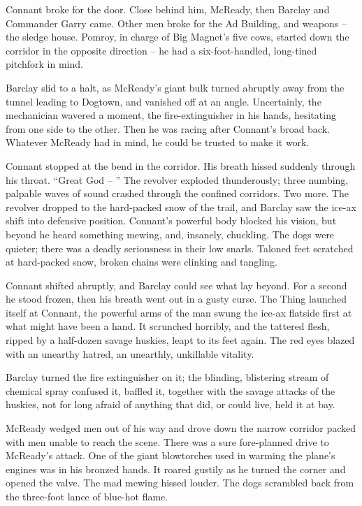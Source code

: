 \documentclass[letterpaper,openany,12pt]{memoir}		%
\begin{document}
Connant broke for the door. Close behind him, McReady, then Barclay and
Commander Garry came. Other men broke for the Ad Building, and weapons -- the
sledge house. Pomroy, in charge of Big Magnet's five cows, started down the
corridor in the opposite direction -- he had a six-foot-handled, long-tined
pitchfork in mind.

Barclay slid to a halt, as McReady's giant bulk turned abruptly away from the
tunnel leading to Dogtown, and vanished off at an angle. Uncertainly, the
mechanician wavered a moment, the fire-extinguisher in his hands, hesitating
from one side to the other. Then he was racing after Connant's broad back.
Whatever McReady had in mind, he could be trusted to make it work.

Connant stopped at the bend in the corridor. His breath hissed suddenly through
his throat. ``Great God -- '' The revolver exploded thunderously; three numbing,
palpable waves of sound crashed through the confined corridors. Two more. The
revolver dropped to the hard-packed snow of the trail, and Barclay saw the
ice-ax shift into defensive position. Connant's powerful body blocked his
vision, but beyond he heard something mewing, and, insanely, chuckling. The dogs
were quieter; there was a deadly seriousness in their low snarls. Taloned feet
scratched at hard-packed snow, broken chains were clinking and tangling.

Connant shifted abruptly, and Barclay could see what lay beyond. For a second he
stood frozen, then his breath went out in a gusty curse. The Thing launched
itself at Connant, the powerful arms of the man swung the ice-ax flatside first
at what might have been a hand. It scrunched horribly, and the tattered flesh,
ripped by a half-dozen savage huskies, leapt to its feet again. The red eyes
blazed with an unearthy hatred, an unearthly, unkillable vitality.

Barclay turned the fire extinguisher on it; the blinding, blistering stream of
chemical spray confused it, baffled it, together with the savage attacks of the
huskies, not for long afraid of anything that did, or could live, held it at
bay.

McReady wedged men out of his way and drove down the narrow corridor packed with
men unable to reach the scene. There was a sure fore-planned drive to McReady's
attack. One of the giant blowtorches used in warming the plane's engines was in
his bronzed hands. It roared gustily as he turned the corner and opened the
valve. The mad mewing hissed louder. The dogs scrambled back from the three-foot
lance of blue-hot flame.
\end{document}
